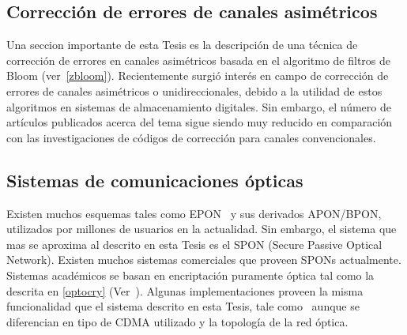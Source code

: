 \subsection{Corrección de errores de canales asimétricos}

Una seccion importante de esta Tesis es la descripción de una técnica de corrección de errores en canales asimétricos basada en el algoritmo de filtros de Bloom (ver~\ref{zbloom}). Recientemente surgió interés en campo de corrección de errores de canales asimétricos o unidireccionales, debido a la utilidad de estos algoritmos en sistemas de almacenamiento digitales\cite{tanakamaru201195}. Sin embargo, el número de artículos publicados acerca del tema sigue siendo muy reducido en comparación con las investigaciones de códigos de corrección para canales convencionales.

\subsection{Sistemas de comunicaciones ópticas}

Existen muchos esquemas tales como EPON~\cite{kramer2002ethernet} y sus derivados APON/BPON, utilizados por millones de usuarios en la actualidad.
Sin embargo, el sistema que mas se aproxima al descrito en esta Tesis es el SPON (Secure Passive Optical Network). Existen muchos sistemas comerciales que proveen SPONs actualmente. Sistemas académicos se basan en encriptación puramente óptica tal como la descrita en \ref{optocry} (Ver~\cite{cincotti2009secure}). Algunas implementaciones proveen la misma funcionalidad que el sistema descrito en esta Tesis, tale como~\cite{nadarajah2006implementation} aunque se diferencian en tipo de CDMA utilizado y la topología de la red óptica.
